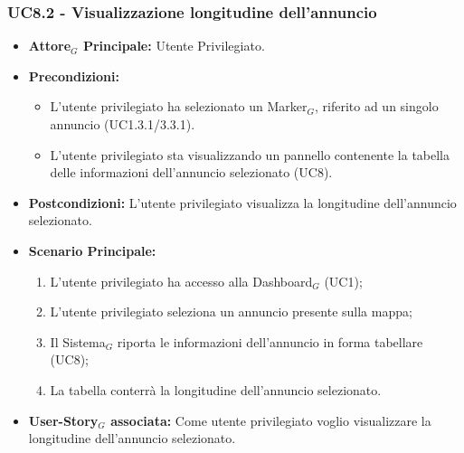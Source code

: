 \documentclass[10pt]{article}
\begin{document}
\begin{justify}
 \subsubsection{\textbf{UC8.2 - Visualizzazione longitudine dell'annuncio}}
 \begin{itemize}
     \item \textbf{Attore$_G$ Principale:} Utente Privilegiato.
     \item \textbf{Precondizioni:}
       \begin{itemize}
    	        \item L'utente privilegiato ha selezionato un Marker$_G$, riferito ad un singolo annuncio (UC1.3.1/3.3.1).
          \item L'utente privilegiato sta visualizzando un pannello contenente la tabella delle informazioni dell'annuncio selezionato (UC8).
       \end{itemize}
     \item \textbf{Postcondizioni:} L'utente privilegiato visualizza la longitudine dell'annuncio selezionato.
     \item \textbf{Scenario Principale:}
        \begin{enumerate}
            \item L'utente privilegiato ha accesso alla Dashboard$_G$ (UC1);
            \item L'utente privilegiato seleziona un annuncio presente sulla mappa;
            \item Il Sistema$_G$ riporta le informazioni dell'annuncio in forma tabellare (UC8);
            \item La tabella conterrà la longitudine dell'annuncio selezionato.
        \end{enumerate}
     \item \textbf{User-Story$_G$ associata:} Come utente privilegiato voglio visualizzare la longitudine dell'annuncio selezionato. 
 \end{itemize}

\end{justify}
\end{document}
